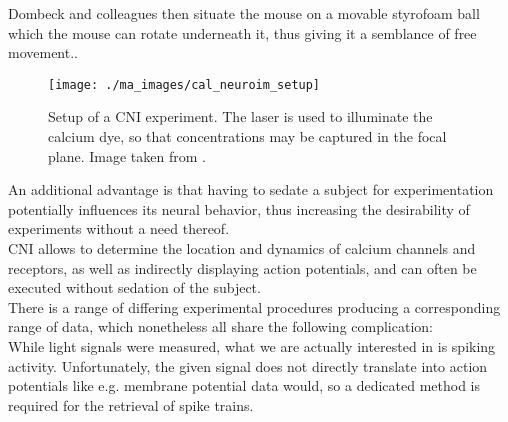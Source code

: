 \documentclass[titlepage]{article}
\begin{document}
Dombeck and colleagues then situate the mouse on a movable styrofoam ball which the mouse can rotate underneath it, thus giving it a semblance of free movement.\cite{dombeck_two-photon_2014}.
\\
\begin{figure}[H]
\centering
\texttt{[image: ./ma\_images/cal\_neuroim\_setup]}
\caption{Setup of a CNI experiment. The laser is used to illuminate the calcium dye, so that concentrations may be captured in the focal plane. Image taken from \citeauthor{dombeck_imaging_2007}\cite{dombeck_imaging_2007}.}
\label{fig:cal_neuroim_setup}
\end{figure}
An additional advantage is that having to sedate a subject for experimentation potentially influences its neural behavior, thus increasing the desirability of experiments without a need thereof.\\
CNI allows to determine the location and dynamics of calcium channels and receptors, as well as indirectly displaying action potentials, and can often be executed without sedation of the subject\cite{grienberger_imaging_2012}.\\
There is a range of differing experimental procedures producing a corresponding range of data, which nonetheless all share the following complication:\\
While light signals were measured, what we are actually interested in is spiking activity. Unfortunately, the given signal does not directly translate into action potentials like e.g. membrane potential data would, so a dedicated method is required for the retrieval of spike trains\cite{pnevmatikakis_simultaneous_2016}.
\end{document}
